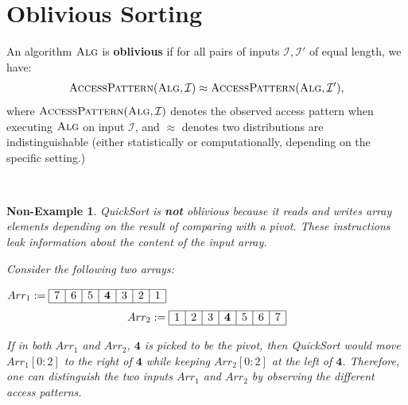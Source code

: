 \newcommand{\rsmpl}{\xleftarrow{\$}}

\newcommand{\alg}{\textsc{Alg}}

\newcommand{\ap}{\textsc{AccessPattern}}
\newtheorem{nonexample}[theorem]{Non-Example}


\section{Oblivious Sorting}

\begin{definition}
    An algorithm $\alg$ is \textbf{oblivious} if for all pairs of inputs $\mathcal{I}, \mathcal{I}'$ of equal length, we have:
    \[\ap(\alg, \mathcal{I}) \approx \ap(\alg, \mathcal{I}'), \]
where $\ap(\alg, \mathcal{I})$ denotes the observed access pattern when executing $\alg$ on input $\mathcal{I}$, and $\approx$ denotes two distributions are indistinguishable (either statistically or computationally, depending on the specific setting.)
\end{definition}

$ $

\begin{nonexample}
    QuickSort is \textbf{not} oblivious because it reads and writes array elements depending on the result of comparing with a pivot. These instructions leak information about the content of the input array.

    Consider the following two arrays: 
    \begin{center} 
 $Arr_1 := \begin{array}{|c|c|c|c|c|c|c|} \hline 
 7 & 6 & 5 & \textbf{4} & 3 & 2 & 1
 \\ 
\hline
\end{array}
$
 \[ Arr_2 := \begin{array}{|c|c|c|c|c|c|c|} \hline 
1 & 2 & 3 & \textbf{4} & 5 & 6 & 7
\\ 
\hline
\end{array}
\]

\end{center}

If in both $Arr_1$ and $Arr_2$, $\textbf{4}$ is picked to be the pivot, then QuickSort would move $Arr_1[0:2]$ to the right of $\textbf{4}$ while keeping $Arr_2[0:2]$ at the left of $\textbf{4}$. Therefore, one can distinguish the two inputs $Arr_1$ and $Arr_2$ by observing the different access patterns. 

\end{nonexample}

